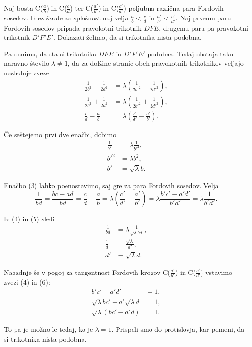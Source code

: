 \documentclass[mat1]{fmfdelo}
\begin{document}
\begin{dokaz}
%
Naj bosta C($\frac{a}{b}$) in C($\frac{c}{d}$) ter C($\frac{a'}{b'}$) in C($\frac{c'}{d'}$) poljubna različna para Fordovih sosedov. Brez škode za splošnost naj velja $\frac{a}{b}<\frac{c}{d}$ in $\frac{a'}{b'}<\frac{c'}{d'}$. Naj prvemu paru Fordovih sosedov pripada pravokotni trikotnik $DFE$, drugemu paru pa pravokotni trikotnik $D'F'E'$. Dokazati želimo, da si trikotnika nista podobna.

Pa denimo, da sta si trikotnika $DFE$ in $D'F'E'$ podobna. Tedaj obstaja tako naravno število $\lambda\ne{1}$, da za dolžine stranic obeh pravokotnih trikotnikov veljajo naslednje zveze:
%
\begin{align}
\frac{1}{2b^2}-\frac{1}{2d^2} &= \lambda \left (\frac{1}{2b'^2}-\frac{1}{2d'^2} \right ), \\
\frac{1}{2b^2}+\frac{1}{2d^2} &= \lambda \left (\frac{1}{2b'^2}+\frac{1}{2d'^2} \right ), \\
\frac{c}{d}-\frac{a}{b} &= \lambda \left (\frac{c'}{d'}-\frac{a'}{b'} \right ).
\end{align}

Če seštejemo prvi dve enačbi, dobimo
%
\begin{align}
\frac{1}{b^2} &= \lambda \frac{1}{b'^2}, \nonumber \\
b'^2 &= \lambda b^2, \nonumber \\
b' &= \sqrt\lambda b.
\end{align}

Enačbo (3) lahko poenostavimo, saj gre za para Fordovih sosedov. Velja
\begin{equation}
\frac{1}{bd} = \frac{bc-ad}{bd} = \frac{c}{d}-\frac{a}{b} = \lambda \left (\frac{c'}{d'}-\frac{a'}{b'} \right ) = \lambda \frac{b'c'-a'd'}{b'd'} = \lambda \frac{1}{b'd'}.
\end{equation}

Iz (4) in (5) sledi 
%
\begin{align}
\frac{1}{bd} &=\lambda \frac{1}{\sqrt\lambda bd'}, \nonumber \\
\frac{1}{d} &= \frac{\sqrt\lambda}{d'}, \nonumber \\
d' &= \sqrt\lambda d.
\end{align}

Nazadnje še v pogoj za tangentnost Fordovih krogov C($\frac{a'}{b'}$) in C($\frac{c'}{d'}$) vstavimo zvezi (4) in (6):
%
\begin{align}
b'c'-a'd' &= 1, \nonumber \\
\sqrt\lambda bc' - a' \sqrt\lambda d &= 1, \nonumber \\
\sqrt\lambda (bc'-a'd) &= 1.
\end{align}

To pa je možno le tedaj, ko je $\lambda=1.$ Prispeli smo do protislovja, kar pomeni, da si trikotnika nista podobna.
%
\end{dokaz}
\end{document}
